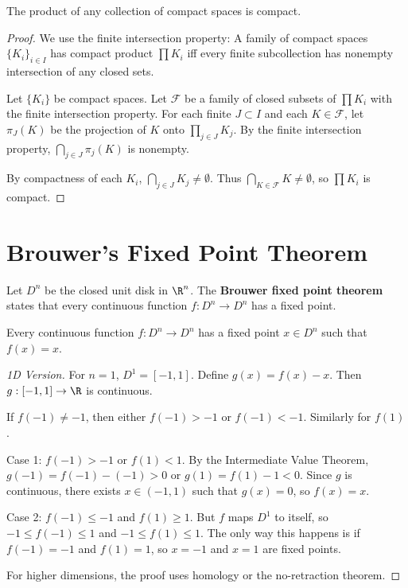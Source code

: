 \begin{theorem}
\label{thm:tychonoff}
The product of any collection of compact spaces is compact.
\end{theorem}

\begin{proof}
We use the finite intersection property: A family of compact spaces $\{K_i\}_{i \in I}$ has compact product $\prod K_i$ iff every finite subcollection has nonempty intersection of any closed sets.

Let $\{K_i\}$ be compact spaces. Let $\mathcal{F}$ be a family of closed subsets of $\prod K_i$ with the finite intersection property. For each finite $J \subset I$ and each $K \in \mathcal{F}$, let $\pi_J(K)$ be the projection of $K$ onto $\prod_{j \in J} K_j$. By the finite intersection property, $\bigcap_{j \in J} \pi_j(K)$ is nonempty.

By compactness of each $K_i$, $\bigcap_{j \in J} K_j \neq \emptyset$. Thus $\bigcap_{K \in \mathcal{F}} K \neq \emptyset$, so $\prod K_i$ is compact.
\end{proof}

\section{Brouwer's Fixed Point Theorem}
\label{sec:brouwer-fixed-point}

Let $D^n$ be the closed unit disk in $\R^n$. The \textbf{Brouwer fixed point theorem} states that every continuous function $f: D^n \to D^n$ has a fixed point.

\begin{theorem}
\label{thm:brouwer-fixed-point}
Every continuous function $f: D^n \to D^n$ has a fixed point $x \in D^n$ such that $f(x) = x$.
\end{theorem}

\begin{proof}[1D Version]
For $n = 1$, $D^1 = [-1, 1]$. Define $g(x) = f(x) - x$. Then $g: [-1, 1] \to \R$ is continuous.

If $f(-1) \neq -1$, then either $f(-1) > -1$ or $f(-1) < -1$. Similarly for $f(1)$.

Case 1: $f(-1) > -1$ or $f(1) < 1$. By the Intermediate Value Theorem, $g(-1) = f(-1) - (-1) > 0$ or $g(1) = f(1) - 1 < 0$. Since $g$ is continuous, there exists $x \in (-1, 1)$ such that $g(x) = 0$, so $f(x) = x$.

Case 2: $f(-1) \leq -1$ and $f(1) \geq 1$. But $f$ maps $D^1$ to itself, so $-1 \leq f(-1) \leq 1$ and $-1 \leq f(1) \leq 1$. The only way this happens is if $f(-1) = -1$ and $f(1) = 1$, so $x = -1$ and $x = 1$ are fixed points.

For higher dimensions, the proof uses homology or the no-retraction theorem.
\end{proof}

